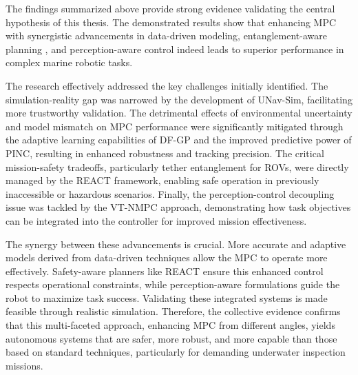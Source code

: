 \label{sec:analysis_results}

The findings summarized above provide strong evidence validating the central hypothesis of this thesis. The demonstrated results show that enhancing \ac{MPC} with synergistic advancements in data-driven modeling, entanglement-aware  planning , and perception-aware control indeed leads to superior performance in complex marine robotic tasks.

The research effectively addressed the key challenges initially identified. The simulation-reality gap was narrowed by the development of UNav-Sim, facilitating more trustworthy validation. The detrimental effects of environmental uncertainty and model mismatch on \ac{MPC} performance were significantly mitigated through the adaptive learning capabilities of DF-GP and the improved predictive power of PINC, resulting in enhanced robustness and tracking precision. The critical mission-safety tradeoffs, particularly tether entanglement for \acp{ROV}, were directly managed by the REACT framework, enabling safe operation in previously inaccessible or hazardous scenarios. Finally, the perception-control decoupling issue was tackled by the VT-NMPC approach, demonstrating how task objectives can be integrated into the controller for improved mission effectiveness.

The synergy between these advancements is crucial. More accurate and adaptive models derived from data-driven techniques allow the \ac{MPC} to operate more effectively. Safety-aware planners like REACT ensure this enhanced control respects operational constraints, while perception-aware formulations guide the robot to maximize task success. Validating these integrated systems is made feasible through realistic simulation. Therefore, the collective evidence confirms that this multi-faceted approach, enhancing \ac{MPC} from different angles, yields autonomous systems that are safer, more robust, and more capable than those based on standard techniques, particularly for demanding underwater inspection missions.

